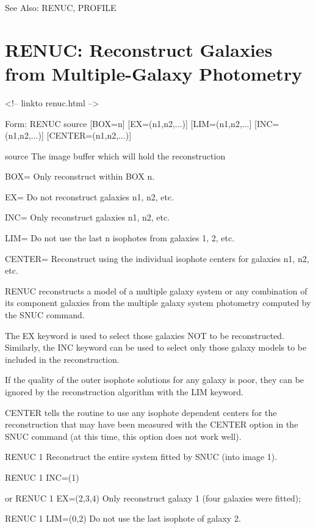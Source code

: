 See Also: RENUC, PROFILE


\section{RENUC: Reconstruct Galaxies from Multiple-Galaxy Photometry}
\begin{rawhtml}
<!-- linkto renuc.html -->
\end{rawhtml}
\begin{command} 
  \item[Form: RENUC source {[BOX=n]} {[EX=(n1,n2,...)]} {[LIM=(n1,n2,...]}
       {[INC=(n1,n2,...)]} {[CENTER=(n1,n2,...)]}\hfill]{}
  \item[source]{The image buffer which will hold the reconstruction}
  \item[BOX=]{Only reconstruct within BOX n.}
  \item[EX=]{Do not reconstruct galaxies n1, n2, etc.}
  \item[INC=]{Only reconstruct galaxies n1, n2, etc.}
  \item[LIM=]{Do not use the last n isophotes from galaxies 1, 2, etc.}
  \item[CENTER=]{Reconstruct using the individual isophote centers for
       galaxies n1, n2, etc.}
\end{command} 

RENUC reconstructs a model of a multiple galaxy system or any combination
of its component galaxies from the multiple galaxy system photometry
computed by the SNUC command.

The EX keyword is used to select those galaxies NOT to be reconstructed.
Similarly, the INC keyword can be used to select only those galaxy models
to be included in the reconstruction.

If the quality of the outer isophote solutions for any galaxy is poor, they
can be ignored by the reconstruction algorithm with the LIM keyword.

CENTER tells the routine to use any isophote dependent centers for the
reconstruction that may have been measured with the CENTER option in the
SNUC command (at this time, this option does not work well).

\begin{example}
  \item[RENUC 1\hfill]{Reconstruct the entire system fitted by SNUC (into
       image 1).}

  \item[RENUC 1 INC=(1) \hfill]{}

  \item[or RENUC 1 EX=(2,3,4)\hfill]{Only reconstruct galaxy 1 (four
       galaxies were fitted);}

  \item[RENUC 1 LIM=(0,2)\hfill]{Do not use the last isophote of galaxy 2.}
\end{example} 

